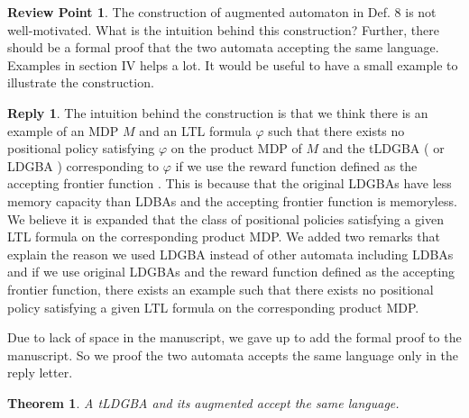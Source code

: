 \documentclass[10 pt, dvipdfmx]{article}
\newtheorem{theorem}{Theorem}
\theoremstyle{definition}
\newtheorem{review point}{Review Point}[section]
\newtheorem*{reply}{Reply}
\begin{document}
\begin{review point}
  The construction of augmented automaton in Def. 8 is not
well-motivated. What is the intuition behind this construction?
Further, there should be a formal proof that the two automata accepting
the same language. Examples in section IV helps a lot. It would be
useful to have a small example to illustrate the construction.
\end{review point}

\begin{reply}
  The intuition behind the construction is that we think there is an example of an MDP $M$ and an LTL formula $\varphi$ such that there exists no positional policy satisfying $\varphi$ on the product MDP of $M$ and the tLDGBA ( or LDGBA ) corresponding to $\varphi$ if we use the reward function defined as the accepting frontier function \cite{HAK2019}. This is because that the original LDGBAs have less memory capacity than LDBAs and the accepting frontier function is memoryless. We believe it is expanded that the class of positional policies satisfying a given LTL formula on the corresponding product MDP. We added two remarks that explain the reason we used LDGBA instead of other automata including LDBAs and if we use original LDGBAs and the reward function defined as the accepting frontier function, there exists an example such that there exists no positional policy satisfying a given LTL formula on the corresponding product MDP.

  Due to lack of space in the manuscript, we gave up to add the formal proof to the manuscript. So we proof the two automata accepts the same language only in the reply letter.

  \begin{theorem}
    A tLDGBA and its augmented accept the same language.
  \end{theorem}


\end{reply}
\end{document}
